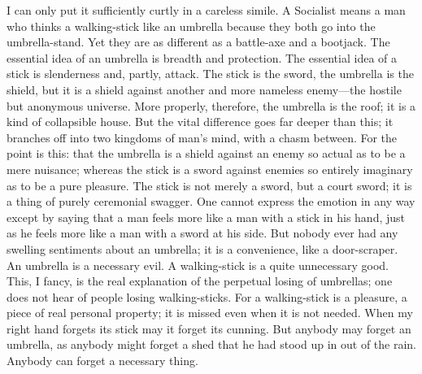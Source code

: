 \documentclass{book}
\begin{document}
I can only put it sufficiently curtly in a careless simile. A Socialist means a man who thinks a walking-stick like an umbrella because they both go into the umbrella-stand. Yet they are as different as a battle-axe and a bootjack. The essential idea of an umbrella is breadth and protection. The essential idea of a stick is slenderness and, partly, attack. The stick is the sword, the umbrella is the shield, but it is a shield against another and more nameless enemy—the hostile but anonymous universe. More properly, therefore, the umbrella is the roof; it is a kind of collapsible house. But the vital difference goes far deeper than this; it branches off into two kingdoms of man’s mind, with a chasm between. For the point is this: that the umbrella is a shield against an enemy so actual as to be a mere nuisance; whereas the stick is a sword against enemies so entirely imaginary as to be a pure pleasure. The stick is not merely a sword, but a court sword; it is a thing of purely ceremonial swagger. One cannot express the emotion in any way except by saying that a man feels more like a man with a stick in his hand, just as he feels more like a man with a sword at his side. But nobody ever had any swelling sentiments about an umbrella; it is a convenience, like a door-scraper. An umbrella is a necessary evil. A walking-stick is a quite unnecessary good. This, I fancy, is the real explanation of the perpetual losing of umbrellas; one does not hear of people losing walking-sticks. For a walking-stick is a pleasure, a piece of real personal property; it is missed even when it is not needed. When my right hand forgets its stick may it forget its cunning. But anybody may forget an umbrella, as anybody might forget a shed that he had stood up in out of the rain. Anybody can forget a necessary thing.
\end{document}

